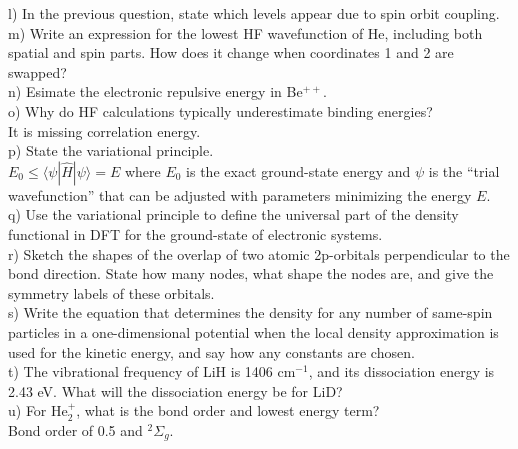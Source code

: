\documentclass{article}
\begin{document}
\noindent l) In the previous question, state which levels appear due to spin orbit
coupling.
\\

\noindent m) Write an expression for the lowest HF wavefunction of He, including both
spatial and spin parts. How does it change when coordinates 1 and 2 are swapped?
\\

\noindent n) Esimate the electronic repulsive energy in Be$^{++}$.
\\

\noindent o) Why do HF calculations typically underestimate binding energies?
\\

{\color{blue} It is missing correlation energy.}
\\

\noindent p) State the variational principle.
\\

{\color{blue} $E_0 \leq \langle\psi|\hat{H}|\psi\rangle = E$ where $E_0$ is the exact
  ground-state energy and $\psi$ is the ``trial wavefunction'' that can be adjusted with
  parameters minimizing the energy $E$.
}\\

\noindent q) Use the variational principle to define the universal part of the density
functional in DFT for the ground-state of electronic systems.
\\

\noindent r) Sketch the shapes of the overlap of two atomic 2p-orbitals perpendicular
to the bond direction. State how many nodes, what shape the nodes are, and give the
symmetry labels of these orbitals.
\\

\noindent s) Write the equation that determines the density for any number of same-spin
particles in a one-dimensional potential when the local density approximation is used
for the kinetic energy, and say how any constants are chosen.
\\

\noindent t) The vibrational frequency of LiH is 1406 cm$^{-1}$, and its dissociation
energy is 2.43 eV. What will the dissociation energy be for LiD?
\\

\noindent u) For He$_2^+$, what is the bond order and lowest energy term?
\\

{\color{blue} Bond order of 0.5 and $^2\Sigma_g$.}
\\
\end{document}
